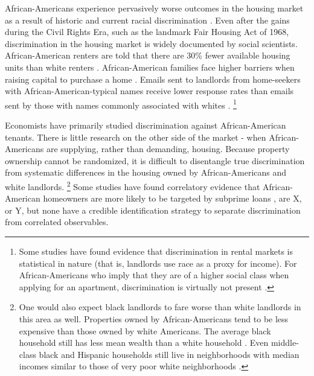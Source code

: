 
African-Americans experience pervasively worse outcomes in the housing market as a result of historic and current racial discrimination \citep{krysan}. Even after the gains during the Civil Rights Era, such as the landmark Fair Housing Act of 1968, discrimination in the housing market is widely documented by social scientists. African-American renters are told that there are 30\% fewer available housing units than white renters \citep{yinger1}. African-American families face higher barriers when raising capital to purchase a home \citep{pope}. Emails sent to landlords from home-seekers with African-American-typical names receive lower response rates than emails sent by those with names commonly associated with whites \citep{hanson}.%
	\footnote{Some studies have found evidence that discrimination in rental markets is statistical in nature (that is, landlords use race as a proxy for income). For African-Americans who imply that they are of a higher social class when applying for an apartment, discrimination is virtually not present \citep{hanson}.}


Economists have primarily studied discrimination against African-American tenants. There is little research on the other side of the market - when African-Americans are supplying, rather than demanding, housing. Because property ownership cannot be randomized, it is difficult to disentangle true discrimination from systematic differences in the housing owned by African-Americans and white landlords.%
	\footnote{One would also expect black landlords to fare worse than white landlords in this area as well. Properties owned by African-Americans tend to be less expensive than those owned by white Americans. The average black household still has less mean wealth than a white household \citep{oliver}. Even middle-class black and Hispanic households still live in neighborhoods with median incomes similar to those of very poor white neighborhoods \citep{reardon}.} 
Some studies have found correlatory evidence that African-American homeowners are more likely to be targeted by subprime loans \citep{foreclosure}, are X, or Y, but none have a credible identification strategy to separate discrimination from correlated observables. 


